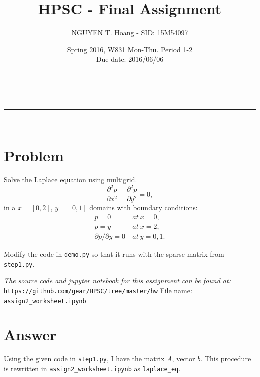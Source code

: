 \documentclass[a4paper,12pt]{article}
\makeatletter
\newcommand{\linia}{\rule{\linewidth}{0.5pt}}
\renewcommand{\maketitle} {%
\begin{center}
\vspace{2ex}
{\huge \textsc{\@title}}
\vspace{1ex}
\\
\linia\\
\@author \hfill \@date
\vspace{4ex}
\end{center}
}
\makeatother
\begin{document}

\title{HPSC - Final Assignment}

\author{NGUYEN T. Hoang - SID: 15M54097}

\date{Spring 2016, W831 Mon-Thu. Period 1-2 \\ \hfill Due date: 2016/06/06}

\maketitle

\vspace{8em}
\section*{Problem}
\noindent
Solve the Laplace equation using multigrid.
$$\frac{\partial^2p}{\partial x^2} + \frac{\partial^2p}{\partial y^2} = 0,$$
in a $x=[0,2]$, $y=[0,1]$ domains with boundary conditions:
\begin{equation*}
    \begin{aligned}
        p=0 \ & at\ x=0,\\
        p=y \ & at\ x=2,\\
        \partial p / \partial y = 0 \ & at\ y=0,1.
    \end{aligned}
\end{equation*}

Modify the code in \texttt{demo.py} so that it runs with the sparse matrix from \texttt{step1.py}.

\vspace{10em}
\noindent
\emph{The source code and jupyter notebook for this assignment can be found at:} \\
\texttt{https://github.com/gear/HPSC/tree/master/hw}
File name: \texttt{assign2\_worksheet.ipynb}
\pagebreak
\section*{Answer}

\noindent
Using the given code in \texttt{step1.py}, I have the matrix $A$, vector $b$. This procedure is rewritten in \texttt{assign2\_worksheet.ipynb} as \texttt{laplace\_eq}.
\end{document}
